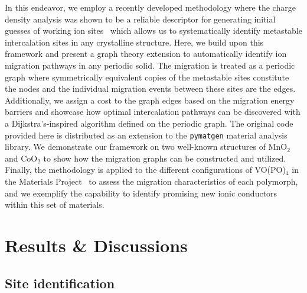 \documentclass[reprint,preprintnumbers,amsmath,amssymb,aps,prl]{revtex4-1}
\begin{document}
In this endeavor, we employ a recently developed methodology where the charge density analysis was shown to be a reliable descriptor for generating initial guesses of working ion sites~\cite{Shen2020Oct} which allows us to systematically identify metastable intercalation sites in any crystalline structure. Here, we build upon this framework and present a graph theory extension to automatically identify ion migration pathways in any periodic solid.
The migration is treated as a periodic graph where symmetrically equivalent copies of the metastable sites constitute the nodes and the individual migration events between these sites are the edges.
Additionally, we assign a cost to the graph edges based on the migration energy barriers and showcase how optimal intercalation pathways can be discovered with a Dijkstra's-inspired algorithm defined on the periodic graph.
The original code provided here is distributed as an extension to the \texttt{pymatgen} material analysis library.
We demonstrate our framework on two well-known structures of MnO$_2$ and CoO$_2$ to show how the migration graphs can be constructed and utilized.
Finally, the methodology is applied to the different configurations of VO(PO)$_4$ in the Materials Project~\cite{Jain2013Jul} to assess the migration characteristics of each polymorph, and we exemplify the capability to identify promising new ionic conductors within this set of materials.



\section{Results \& Discussions}\label{sec:results}

\subsection{Site identification}
\end{document}
